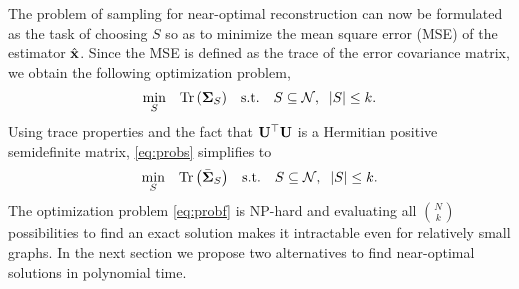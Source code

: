 The problem of sampling for near-optimal reconstruction can now be formulated as the task of choosing $S$ so as to minimize the mean square error (MSE) of the estimator $\hat{\x}$. Since the MSE is defined as the trace of the error covariance matrix, we obtain the following optimization problem,
% 
\begin{equation}\label{eq:probs}
\begin{aligned}
& \underset{S}{\text{min}}
\quad \mathrm{Tr}\left({\S}_S\right)
& \text{s.t.}\quad S \subseteq \mathcal{N}, \phantom{k}|S|\leq k.
\end{aligned}
\end{equation}
%
Using trace properties and the fact that $\U^\top\U$ is a Hermitian positive semidefinite matrix, \ref{eq:probs} simplifies to
%
\begin{equation}\label{eq:probf}
\begin{aligned}
& \underset{S}{\text{min}}
\quad \mathrm{Tr}\left(\bar{\S}_S\right)
& \text{s.t.}\quad S \subseteq \mathcal{N}, \phantom{k}|S| \leq k.
\end{aligned}
\end{equation}
%
The optimization problem \ref{eq:probf} is NP-hard and evaluating all ${N}\choose{k}$ possibilities to find an exact solution makes it intractable even for relatively small graphs. In the next section we propose two alternatives to find near-optimal solutions in polynomial time.
